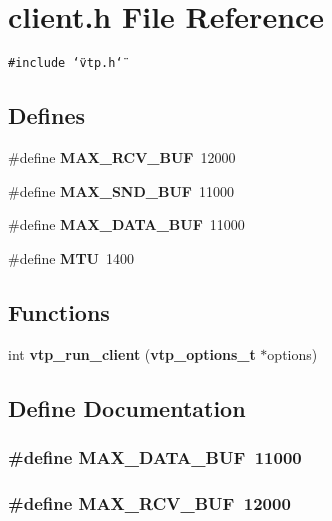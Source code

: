\section{client.h File Reference}
\label{client_8h}
{\tt \#include \char`\"{}vtp.h\char`\"{}}\par
\subsection*{Defines}
\begin{CompactItemize}
\item 
\#define {\bf MAX\_\-RCV\_\-BUF}\ 12000
\item 
\#define {\bf MAX\_\-SND\_\-BUF}\ 11000
\item 
\#define {\bf MAX\_\-DATA\_\-BUF}\ 11000
\item 
\#define {\bf MTU}\ 1400
\end{CompactItemize}
\subsection*{Functions}
\begin{CompactItemize}
\item 
int {\bf vtp\_\-run\_\-client} ({\bf vtp\_\-options\_\-t} $\ast$options)
\end{CompactItemize}


\subsection{Define Documentation}
\subsubsection{\setlength{\rightskip}{0pt plus 5cm}\#define MAX\_\-DATA\_\-BUF\ 11000}\label{client_8h_a2}


\subsubsection{\setlength{\rightskip}{0pt plus 5cm}\#define MAX\_\-RCV\_\-BUF\ 12000}\label{client_8h_a0}


